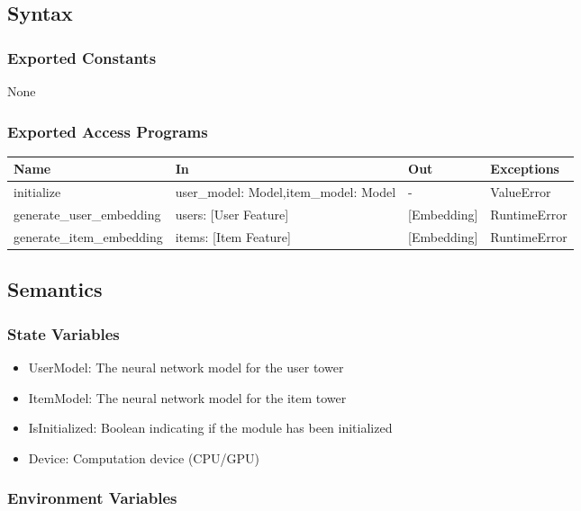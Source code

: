 \documentclass[12pt, titlepage]{article}
\begin{document}
\subsection{Syntax}

\subsubsection{Exported Constants}
None
\subsubsection{Exported Access Programs}

\begin{center}
  \begin{tabular}{p{5cm} p{4cm} p{4cm} p{3cm}}
  \hline
  \textbf{Name} & \textbf{In} & \textbf{Out} & \textbf{Exceptions} \\
  \hline
  initialize & user\_model: Model,item\_model: Model & - & ValueError \\
  \hline
  generate\_user\_embedding & users: [User Feature] & [Embedding] & RuntimeError\\
  \hline
  generate\_item\_embedding & items: [Item Feature] & [Embedding] & RuntimeError\\
  \hline
  \end{tabular}
\end{center}

\subsection{Semantics}

\subsubsection{State Variables}
\begin{itemize}
  \item UserModel: The neural network model for the user tower
  \item ItemModel: The neural network model for the item tower
  \item IsInitialized: Boolean indicating if the module has been initialized
  \item Device: Computation device (CPU/GPU)
\end{itemize}

\subsubsection{Environment Variables}
\end{document}
